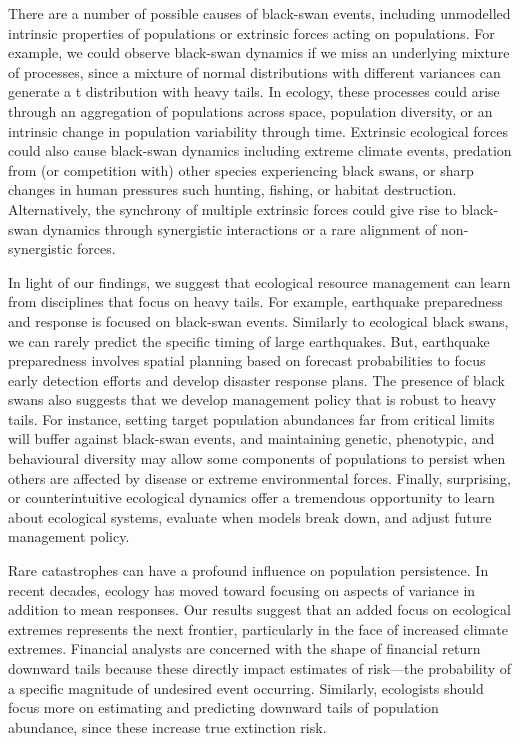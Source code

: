 
There are a number of possible causes of black-swan events, including unmodelled intrinsic properties of populations or extrinsic forces acting on populations. For example, we could observe black-swan dynamics if we miss an underlying mixture of processes, since a mixture of normal distributions with different variances can generate a t distribution with heavy tails\cite{allen2001}. In ecology, these processes could arise through an aggregation of populations across space, population diversity\cite{schindler2010}, or an intrinsic change in population variability through time\cite{carpenter2006}. Extrinsic ecological forces could also cause black-swan dynamics\cite{nunez2012} including extreme climate events\cite{meehl2004, katz2005, ipcc2012}, predation from (or competition with) other species experiencing black swans, or sharp changes in human pressures such hunting, fishing, or habitat destruction. Alternatively, the synchrony of multiple extrinsic forces could give rise to black-swan dynamics through synergistic interactions\cite{kirby2009} or a rare alignment of non-synergistic forces\cite{denny2009}.

In light of our findings, we suggest that ecological resource management can learn from disciplines that focus on heavy tails. For example, earthquake preparedness and response is focused on black-swan events. Similarly to ecological black swans, we can rarely predict the specific timing of large earthquakes. But, earthquake preparedness involves spatial planning based on forecast probabilities to focus early detection efforts and develop disaster response plans\cite{nrc2007}. The presence of black swans also suggests that we develop management policy that is robust to heavy tails. For instance, setting target population abundances far from critical limits will buffer against black-swan events\cite{caddy1996}, and maintaining genetic, phenotypic, and behavioural diversity may allow some components of populations to persist when others are affected by disease or extreme environmental forces\cite{schindler2010}. Finally, surprising, or counterintuitive ecological dynamics offer a tremendous opportunity to learn about ecological systems, evaluate when models break down, and adjust future management policy\cite{doak2008, lindenmayer2010}.

Rare catastrophes can have a profound influence on population persistence\cite{mangel1994}. In recent decades, ecology has moved toward focusing on aspects of variance in addition to mean responses\cite{loreau2010a, thompson2013}. Our results suggest that an added focus on ecological extremes represents the next frontier, particularly in the face of increased climate extremes\cite{meehl2004, ipcc2012, thompson2013}. Financial analysts are concerned with the shape of financial return downward tails because these directly impact estimates of risk---the probability of a specific magnitude of undesired event occurring\cite{rachev2008}. Similarly, ecologists should focus more on estimating and predicting downward tails of population abundance, since these increase true extinction risk.

